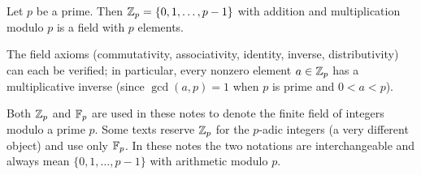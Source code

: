 \begin{thmbox}
Let $p$ be a prime.  Then $\mathbb{Z}_p = \{0,1,\ldots,p-1\}$ with addition and
multiplication modulo $p$ is a field with $p$ elements.

\medskip
The field axioms (commutativity, associativity, identity, inverse,
distributivity) can each be verified; in particular, every nonzero element
$a \in \mathbb{Z}_p$ has a multiplicative inverse (since $\gcd(a,p)=1$ when $p$ is
prime and $0<a<p$).
\end{thmbox}

\begin{warnbox}
Both $\mathbb{Z}_p$ and $\mathbb{F}_p$ are used in these notes to denote the finite field of
integers modulo a prime $p$.  Some texts reserve $\mathbb{Z}_p$ for the $p$-adic
integers (a very different object) and use only $\mathbb{F}_p$.
In these notes the two notations are interchangeable and always mean
$\{0,1,\ldots,p-1\}$ with arithmetic modulo $p$.
\end{warnbox}
